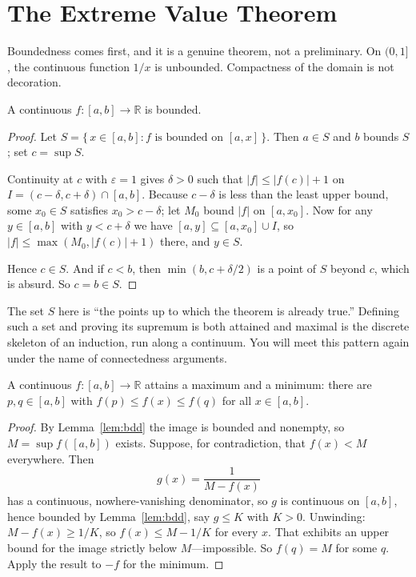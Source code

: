 \documentclass{essay}
\begin{document}
\section{The Extreme Value Theorem}

Boundedness comes first, and it is a genuine theorem, not a preliminary. On $(0,1]$, the continuous function $1/x$ is unbounded. Compactness of the domain is not decoration.

\begin{lemma}[Boundedness]\label{lem:bdd}
A continuous $f : [a,b] \to \mathbb{R}$ is bounded.
\end{lemma}

\begin{proof}
Let $S = \{\, x \in [a,b] : f \text{ is bounded on } [a,x] \,\}$. Then $a \in S$ and $b$ bounds $S$; set $c = \sup S$.

Continuity at $c$ with $\varepsilon = 1$ gives $\delta > 0$ such that $|f| \leq |f(c)| + 1$ on $I = (c - \delta, c + \delta) \cap [a,b]$. Because $c - \delta$ is less than the least upper bound, some $x_{0} \in S$ satisfies $x_{0} > c - \delta$; let $M_{0}$ bound $|f|$ on $[a, x_{0}]$. Now for any $y \in [a,b]$ with $y < c + \delta$ we have $[a,y] \subseteq [a,x_{0}] \cup I$, so $|f| \leq \max(M_{0}, |f(c)| + 1)$ there, and $y \in S$.

Hence $c \in S$. And if $c < b$, then $\min(b, c + \delta/2)$ is a point of $S$ beyond $c$, which is absurd. So $c = b \in S$.
\end{proof}

The set $S$ here is ``the points up to which the theorem is already true.'' Defining such a set and proving its supremum is both attained and maximal is the discrete skeleton of an induction, run along a continuum. You will meet this pattern again under the name of connectedness arguments.

\begin{theorem}\label{thm:evt}
A continuous $f : [a,b] \to \mathbb{R}$ attains a maximum and a minimum: there are $p, q \in [a,b]$ with $f(p) \leq f(x) \leq f(q)$ for all $x \in [a,b]$.
\end{theorem}

\begin{proof}
By Lemma~\ref{lem:bdd} the image is bounded and nonempty, so $M = \sup f([a,b])$ exists. Suppose, for contradiction, that $f(x) < M$ everywhere. Then
\[
g(x) = \frac{1}{M - f(x)}
\]
has a continuous, nowhere-vanishing denominator, so $g$ is continuous on $[a,b]$, hence bounded by Lemma~\ref{lem:bdd}, say $g \leq K$ with $K > 0$. Unwinding: $M - f(x) \geq 1/K$, so $f(x) \leq M - 1/K$ for every $x$. That exhibits an upper bound for the image strictly below $M$---impossible. So $f(q) = M$ for some $q$. Apply the result to $-f$ for the minimum.
\end{proof}
\end{document}
